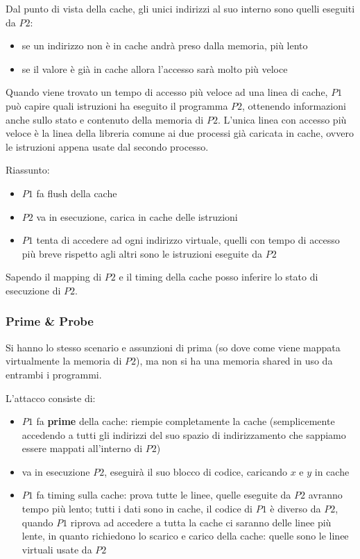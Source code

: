 Dal punto di vista della cache, gli unici indirizzi al suo interno sono quelli eseguiti da $P2$:
\begin{itemize}
	\item se un indirizzo non è in cache andrà preso dalla memoria, più lento
	\item se il valore è già in cache allora l'accesso sarà molto più veloce
\end{itemize}

Quando viene trovato un tempo di accesso più veloce ad una linea di cache, $P1$ può capire quali istruzioni ha eseguito il programma $P2$, ottenendo informazioni anche sullo stato e contenuto della memoria di $P2$. L'unica linea con accesso più veloce è la linea della libreria comune ai due processi già caricata in cache, ovvero le istruzioni appena usate dal secondo processo.

Riassunto: 
\begin{itemize}
	\item $P1$ fa flush della cache
	\item $P2$ va in esecuzione, carica in cache delle istruzioni
	\item $P1$ tenta di accedere ad ogni indirizzo virtuale, quelli con tempo di accesso più breve rispetto agli altri sono le istruzioni eseguite da $P2$
\end{itemize}
Sapendo il mapping di $P2$ e il timing della cache posso inferire lo stato di esecuzione di $P2$.

\subsubsection{Prime \& Probe}

Si hanno lo stesso scenario e assunzioni di prima (so dove come viene mappata virtualmente la memoria di $P2$), ma non si ha una memoria shared in uso da entrambi i programmi.

L'attacco consiste di:
\begin{itemize}
	\item $P1$ fa \textbf{prime} della cache: riempie completamente la cache (semplicemente accedendo a tutti gli indirizzi del suo spazio di indirizzamento che sappiamo essere mappati all'interno di $P2$)
	\item va in esecuzione $P2$, eseguirà il suo blocco di codice, caricando $x$ e $y$ in cache
	\item $P1$ fa timing sulla cache: prova tutte le linee, quelle eseguite da $P2$ avranno tempo più lento; tutti i dati sono in cache, il codice di $P1$ è diverso da $P2$, quando $P1$ riprova ad accedere a tutta la cache ci saranno delle linee più lente, in quanto richiedono lo scarico e carico della cache: quelle sono le linee virtuali usate da $P2$
\end{itemize}

